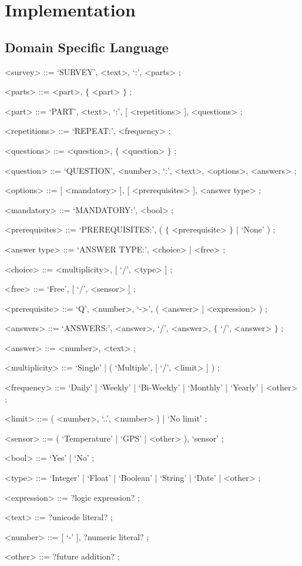 \chapter{Implementation}
\label{chap:implementation}

\section{Domain Specific Language}
\label{sec:dsl}

\begin{grammar}
\label{grammar:ebnf}
      <survey> ::= `SURVEY', <text>, `:', <parts> ;
      
      <parts> ::= <part>, $\lbrace$ <part> $\rbrace$ ; 
       
      <part> ::= `PART', <text>, `:', {[} <repetitions> {]}, <questions> ;
      
      <repetitions> ::= `REPEAT:', <frequency> ;
      
      <questions> ::= <question>, $\lbrace$ <question> $\rbrace$ ;
      
      <question> ::= `QUESTION', <number>, `:', <text>, <options>, <answers> ;
      
      <options> ::= {[} <mandatory> {]}, {[} <prerequisites> {]}, <answer type> ;
      
      <mandatory> ::= `MANDATORY:', <bool> ;
      
      <prerequisites> ::= `PREREQUISITES:', ( $\lbrace$ <prerequisite> $\rbrace$ | `None' ) ;
      
      <answer type> ::= `ANSWER TYPE:', <choice> | <free> ;
      
      <choice> ::= <multiplicity>, {[} `/', <type> {]} ;
      
      <free> ::= `Free', {[} `/', <sensor> {]} ;
      
      <prerequisite> ::= `Q', <number>, `->', ( <answer> | <expression> ) ;
      
      <answers> ::= `ANSWERS:', <answer>, `/', <answer>, $\lbrace$ `/', <answer> $\rbrace$ ;
      
      <answer> ::= <number>, <text> ;
         
      <multiplicity> ::= `Single' | ( `Multiple', {[} `/', <limit> {]} ) ;
      
      <frequency> ::= `Daily' | `Weekly' | `Bi-Weekly' | `Monthly' | `Yearly' | <other> ;
      
      <limit> ::= ( <number>, `..', <number> ) | `No limit' ;
      
      <sensor> ::= ( `Temperature' | `GPS' | <other> ), `sensor' ;
      
      <bool> ::= `Yes' | `No' ;
      
      <type> ::= `Integer' | `Float' | `Boolean' | `String' | `Date' | <other> ;
      
      <expression> ::= ?logic expression? ;
      
      <text> ::= ?unicode literal? ;
      
      <number> ::= {[} `-' {]}, ?numeric literal? ;
      
      <other> ::= ?future addition? ;
\end{grammar}

